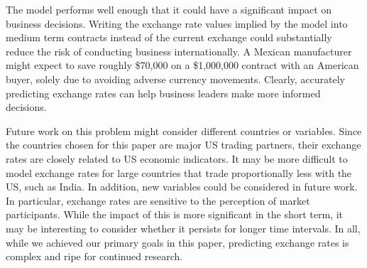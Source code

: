 \documentclass{sig-alternate-05-2015}
\begin{document}
The model performs well enough that it could have a significant impact on business decisions. Writing the exchange rate values implied by the model into medium term contracts instead of the current exchange could substantially reduce the risk of conducting business internationally. A Mexican manufacturer might expect to save roughly \$70,000 on a \$1,000,000 contract with an American buyer, solely due to avoiding adverse currency movements. Clearly, accurately predicting exchange rates can help business leaders make more informed decisions.

Future work on this problem might consider different countries or variables. Since the countries chosen for this paper are major US trading partners, their exchange rates are closely related to US economic indicators. It may be more difficult to model exchange rates for large countries that trade proportionally less with the US, such as India. In addition, new variables could be considered in future work. In particular, exchange rates are sensitive to the perception of market participants. While the impact of this is more significant in the short term, it may be interesting to consider whether it persists for longer time intervals. In all, while we achieved our primary goals in this paper, predicting exchange rates is complex and ripe for continued research.  


     
\newenvironment{hangref}{\begin{list}{}{\setlength{\itemsep}{0pt}
\setlength{\parsep}{0pt}\setlength{\rightmargin}{0pt}
\setlength{\leftmargin}{+\parindent}
\setlength{\itemindent}{-\parindent}}}{\end{list}}
\end{document}
